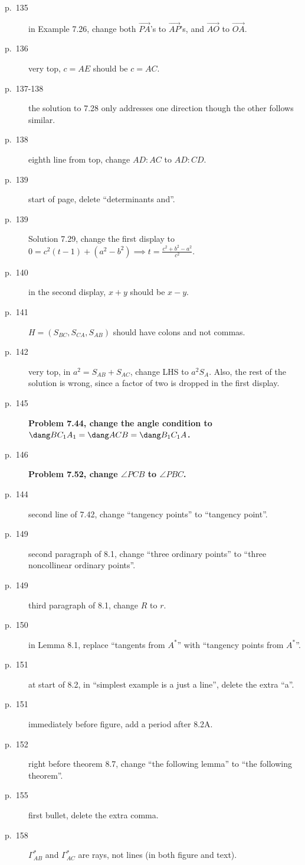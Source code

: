 \documentclass[11pt]{scrartcl}
\newcommand{\crucial}[1]{\textbf{\sffamily\large\color{red} #1}}
\begin{document}
\begin{description}
\item[p.\  135] in Example 7.26, change both $\overrightarrow{PA}$'s to $\overrightarrow{AP}$'s,
  and $\overrightarrow{AO}$ to $\overrightarrow{OA}$.
\item[p.\  136] very top, $c=AE$ should be $c=AC$.
\item[p.\  137-138] the solution to 7.28 only addresses one direction
  though the other follows similar.
\item[p.\  138] eighth line from top, change $AD:AC$ to $AD:CD$.
\item[p.\  139] start of page, delete ``determinants and''.
\item[p.\  139] Solution 7.29, change the first display to
  $0 = c^2(t-1) + (a^2-b^2) \implies t = \frac{c^2+b^2-a^2}{c^2}$.
\item[p.\  140] in the second display, $x+y$ should be $x-y$.
\item[p.\  141] $H = (S_{BC},S_{CA},S_{AB})$ should have
  colons and not commas.
\item[p.\  142] very top, in $a^2=S_{AB}+S_{AC}$, change LHS to $a^2S_A$.
  Also, the rest of the solution is wrong, since a factor of two is dropped in the first display.
\item[p.\  145] \crucial{Problem 7.44, change the angle condition to
  $\dang BC_1A_1 = \dang ACB = \dang B_1C_1A$.}
\item[p.\  146] \crucial{Problem 7.52, change $\angle PCB$ to $\angle PBC$.}
\item[p.\  144] second line of 7.42, change ``tangency points'' to ``tangency point''.
\item[p.\  149] second paragraph of 8.1, change ``three ordinary points''
  to ``three noncollinear ordinary points''.
\item[p.\  149] third paragraph of 8.1, change $R$ to $r$.
\item[p.\  150] in Lemma 8.1, replace ``tangents from $A^\ast$'' with ``tangency points from $A^\ast$''.
\item[p.\  151] at start of 8.2, in ``simplest example is a just a line'', delete the extra ``a''.
\item[p.\  151] immediately before figure, add a period after 8.2A.
\item[p.\  152] right before theorem 8.7,
  change ``the following lemma'' to ``the following theorem''.
\item[p.\  155] first bullet, delete the extra comma.
\item[p.\  158] $\Gamma_{AB}^\ast$ and $\Gamma_{AC}^\ast$ are rays, not lines (in both figure and text).

\end{description}
\end{document}
